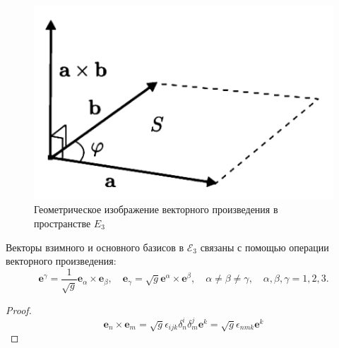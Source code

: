 \begin{figure}[ht!]
	\centering
	\includegraphics[width=0.5\linewidth]{img/que5}
	\caption{Геометрическое изображение векторного произведения в пространстве $E_3$}
	\label{fig:que5}
\end{figure}
\begin{theorem}
	Векторы взимного и основного базисов в $\mathcal{E}_3$ связаны с помощью операции векторного произведения:
	\begin{equation*}
		\mathbf{e}^\gamma = \frac{1}{\sqrt{g}}\mathbf{e}_\alpha\times\mathbf{e}_\beta,\quad\mathbf{e}_\gamma=\sqrt{g}\mathbf{e}^\alpha\times\mathbf{e}^\beta,\quad \alpha\neq\beta\neq\gamma,\quad\alpha,\beta,\gamma=1,2,3.
	\end{equation*}
	\begin{proof}
		\begin{equation*}
			\mathbf{e}_n\times\mathbf{e}_m=\sqrt{g}\epsilon_{ijk}\delta^i_n\delta^j_m\mathbf{e}^k=\sqrt{g}\epsilon_{nmk}\mathbf{e}^k
		\end{equation*}
	\end{proof}
\end{theorem}

